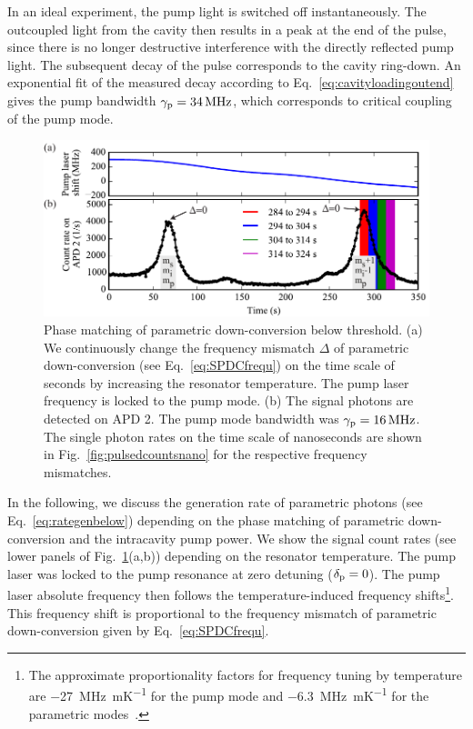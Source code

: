 \documentclass[aps,pra,showpacs,reprint,onecolumn,notitlepage]{revtex4-1}
\newcommand{\tx}[1]{\textnormal{#1}}
\begin{document}
In an ideal experiment, the pump light is switched off instantaneously. The outcoupled light from the cavity then results in a peak at the end of the pulse, since there is no longer destructive interference with the directly reflected pump light. The subsequent decay of the pulse corresponds to the cavity ring-down. An exponential fit of the measured decay according to Eq.~\ref{eq:cavityloadingoutend} gives the pump bandwidth $\gamma_\tx{p}=\SI{34}{\MHz}$, which corresponds to critical coupling of the pump mode.
\begin{figure}[htb]
  \centering
  \includegraphics[scale=0.8]{pictures/exp_WGMR_detuning/SPDC_detuning_tempshift_1.pdf} 
\caption{Phase matching of parametric down-conversion below threshold. (a) We continuously change the frequency mismatch $\Delta$ of parametric down-conversion (see Eq.~\ref{eq:SPDCfrequ}) on the time scale of seconds by increasing the resonator temperature. The pump laser frequency is locked to the pump mode. (b) The signal photons are detected on APD 2. The pump mode bandwidth was $\gamma_\tx{p}=\SI{16}{\MHz}$. The single photon rates on the time scale of nanoseconds are shown in Fig.~\ref{fig:pulsedcountsnano} for the respective frequency mismatches.}
	\label{fig:pulsedcounts}
\end{figure}

In the following, we discuss the generation rate of parametric photons (see Eq.~\ref{eq:rategenbelow}) depending on the phase matching of parametric down-conversion and the intracavity pump power. We show the signal count rates (see lower panels of Fig.~\ref{fig:pulsedcounts}(a,b)) depending on the resonator temperature. The pump laser was locked to the pump resonance at zero detuning ($\delta_\tx{p}=0$). The pump laser absolute frequency then follows the temperature-induced frequency shifts\footnote{The approximate proportionality factors for frequency tuning by temperature are \SI{-27}{\MHz\per\milli\kelvin} for the pump mode and \SI{-6.3}{\MHz\per\milli\kelvin} for the parametric modes~\cite{Schlarb1994,Weis1985}.}. This frequency shift is proportional to the frequency mismatch of parametric down-conversion given by Eq.~\ref{eq:SPDCfrequ}. 
\end{document}
